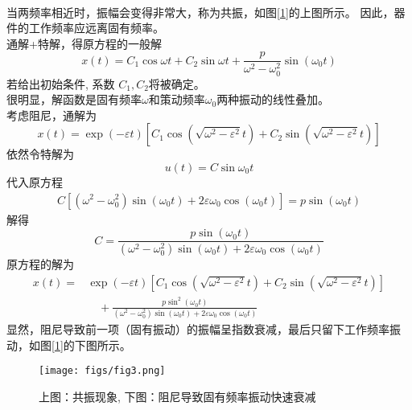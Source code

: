 ~~\\ 
当两频率相近时，振幅会变得非常大，称为共振，如图[\ref{fig:work}]的上图所示。 因此，器件的工作频率应远离固有频率。
~~\\ 

通解+特解，得原方程的一般解
$$ x(t)= C_1 \cos \omega t +C_2 \sin \omega t+ \frac{p}{\omega^2-\omega_{0} ^2 } \sin (\omega_0 t)  $$
若给出初始条件, 系数 $C_1, C_2$将被确定。\\
很明显，解函数是固有频率$\omega$和策动频率$\omega_0$两种振动的线性叠加。\\

考虑阻尼，通解为
  $$ x(t)= \exp(-\varepsilon t) \left[C_1 \cos (\sqrt{\omega ^2 - \varepsilon ^2} t) +C_2 \sin (\sqrt{\omega ^2 - \varepsilon ^2} t) \right] $$ 
  依然令特解为
  $$ u(t) =C \sin \omega_0 t $$
  代入原方程
  $$ \begin{aligned}
	C[(\omega^2-\omega_{0} ^2 ) \sin(\omega_0 t) + 2 \varepsilon \omega_{0} \cos(\omega_0 t) ] =p\sin(\omega_0 t)
  \end{aligned}  $$
解得 
$$ C= \frac{p \sin(\omega_0 t)}{(\omega^2-\omega_{0} ^2 ) \sin(\omega_0 t) + 2 \varepsilon \omega_{0} \cos(\omega_0 t)} $$
原方程的解为
$$ \begin{aligned} x(t)=& \exp(-\varepsilon t) \left[C_1 \cos (\sqrt{\omega ^2 - \varepsilon ^2} t) +C_2 \sin (\sqrt{\omega ^2 - \varepsilon ^2} t) \right] \\
	 & \quad +  \frac{p \sin^2(\omega_0 t)}{(\omega^2-\omega_{0} ^2 ) \sin(\omega_0 t) + 2 \varepsilon \omega_{0} \cos(\omega_0 t)}  
\end{aligned}$$ 
显然，阻尼导致前一项（固有振动）的振幅呈指数衰减，最后只留下工作频率振动，如图[\ref{fig:work}]的下图所示。
\begin{figure}[h]
	\centering
	\texttt{[image: figs/fig3.png]}
	\caption{上图：共振现象, 下图：阻尼导致固有频率振动快速衰减}
	\label{fig:work}
\end{figure}
 
